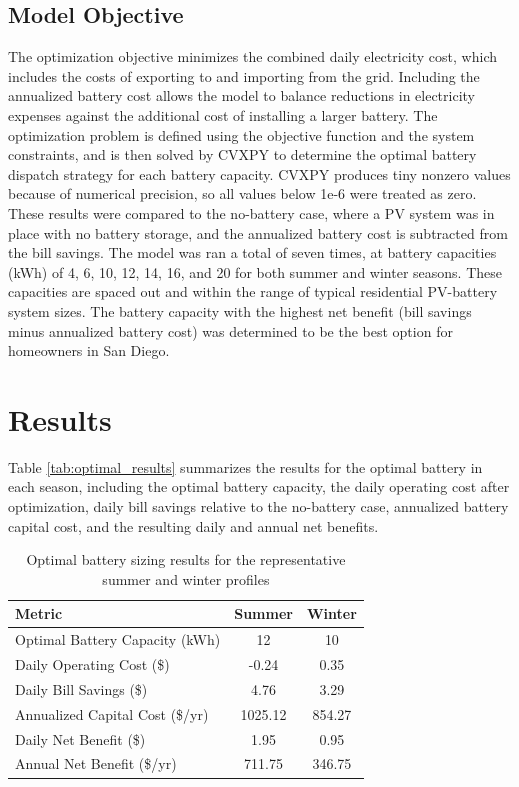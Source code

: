 \documentclass[14pt, final,numbered]{ifacconf}
\begin{document}
\subsection{Model Objective}
The optimization objective minimizes the combined daily electricity cost, which includes the costs of exporting to and importing from the grid. Including the annualized battery cost allows the model to balance reductions in electricity expenses against the additional cost of installing a larger battery. The optimization problem is defined using the objective function and the system constraints, and is then solved by CVXPY to determine the optimal battery dispatch strategy for each battery capacity. CVXPY produces tiny nonzero values because of numerical precision, so all values below 1e-6 were treated as zero. These results were compared to the no-battery case, where a PV system was in place with no battery storage, and the annualized battery cost is subtracted from the bill savings. The model was ran a total of seven times, at battery capacities (kWh) of 4, 6, 10, 12, 14, 16, and 20 for both summer and winter seasons. These capacities are spaced out and within the range of typical residential PV-battery system sizes. The battery capacity with the highest net benefit (bill savings minus annualized battery cost) was determined to be the best option for homeowners in San Diego. 

\section{Results}
Table \ref{tab:optimal_results} summarizes the results for the optimal battery in each season, including the optimal battery capacity, the daily operating cost after optimization, daily bill savings relative to the no-battery case, annualized battery capital cost, and the resulting daily and annual net benefits.

\begin{table}[H]
\centering
\caption{Optimal battery sizing results for the representative summer and winter profiles}
\label{tab:battery_results}
\begin{tabular}{lcc}
\toprule
\textbf{Metric} & \textbf{Summer} & \textbf{Winter} \\
\midrule
Optimal Battery Capacity (kWh) & 12 & 10 \\
Daily Operating Cost (\$) & -0.24 & 0.35 \\
Daily Bill Savings (\$) & 4.76 & 3.29 \\
Annualized Capital Cost (\$/yr) & 1025.12 & 854.27 \\
Daily Net Benefit (\$) & 1.95 & 0.95 \\
Annual Net Benefit (\$/yr) & 711.75 & 346.75 \\
\bottomrule
\end{tabular}
\end{table}
\end{document}
